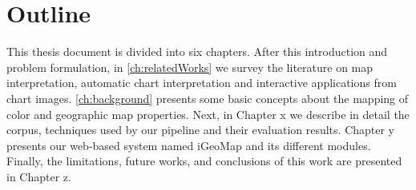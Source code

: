 \section{Outline}
\label{sec:outline}
This thesis document is divided into six chapters. After this introduction and problem formulation, in \autoref{ch:relatedWorks} we survey the literature on map interpretation, automatic chart interpretation and interactive applications from chart images. \autoref{ch:background} presents some basic concepts about the mapping of color and geographic map properties. Next, in Chapter x we describe in detail the corpus, techniques used by our pipeline and their evaluation results. Chapter y presents our web-based system named iGeoMap and its different modules. Finally, the limitations, future works, and conclusions of this work are presented in Chapter z.
